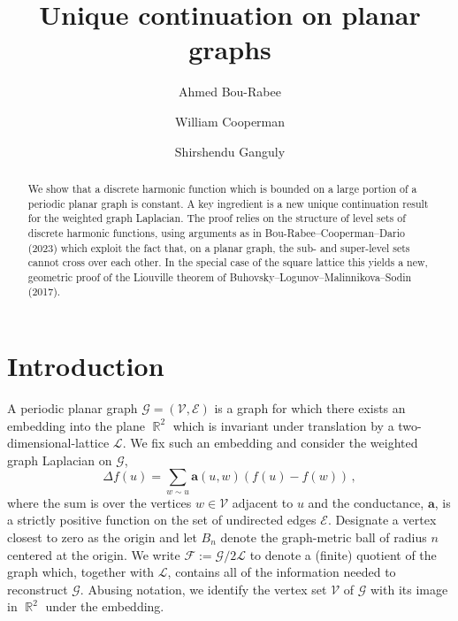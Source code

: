 \documentclass{daj}
\newcommand{\G}{\mathcal{G}}
\newcommand{\V}{\mathcal{V}}
\newcommand{\E}{\mathcal{E}}
\newcommand{\cond}{\mathbf{a}}
\DeclareMathOperator{\R}{\mathbb{R}}
\begin{document}
\begin{frontmatter}[classification=text]

\title{Unique continuation on planar graphs} %

\author[abou]{Ahmed Bou-Rabee}
\author[wcoop]{William Cooperman}
\author[sgang]{Shirshendu Ganguly}



\begin{abstract}
  We show that a discrete harmonic function which is bounded on a large portion of a periodic planar graph is constant. A key ingredient is a new unique continuation result for the weighted graph Laplacian. The proof relies on the structure of level sets of discrete harmonic functions, using arguments as in Bou-Rabee--Cooperman--Dario (2023) which exploit the fact that, on a planar graph, the sub- and super-level sets cannot cross over each other. In the special case of the square lattice this yields a new, geometric proof of the Liouville theorem of Buhovsky–Logunov–Malinnikova–Sodin (2017).
\end{abstract}
\end{frontmatter}

\section{Introduction}\label{sec:intro}
A periodic planar graph $\G = (\V, \E)$ is a graph for which there exists an embedding into the plane $\R^2$ which is invariant under translation by a two-dimensional-lattice $\mathcal{L}$.
We fix such an embedding and consider the weighted graph Laplacian on $\G$,
\[
\Delta f(u) = \sum_{w \sim u} \cond(u,w)( f(u) - f(w)) \,,
\]
where the sum is over the vertices $w \in \V$ adjacent to $u$ and the conductance, $\cond$, is a strictly positive function on the set of undirected edges $\E$. Designate a vertex closest to zero as the origin and let $B_n$ denote the graph-metric ball of radius $n$ centered at the origin. We write $\mathcal{F} := \G / 2\mathcal{L}$ to denote a (finite) quotient of the graph which, together with $\mathcal{L}$, contains all of the information needed to reconstruct $\G$. Abusing notation, we identify the vertex set $\V$ of $\G$ with its image in $\R^2$ under the embedding.
\end{document}
